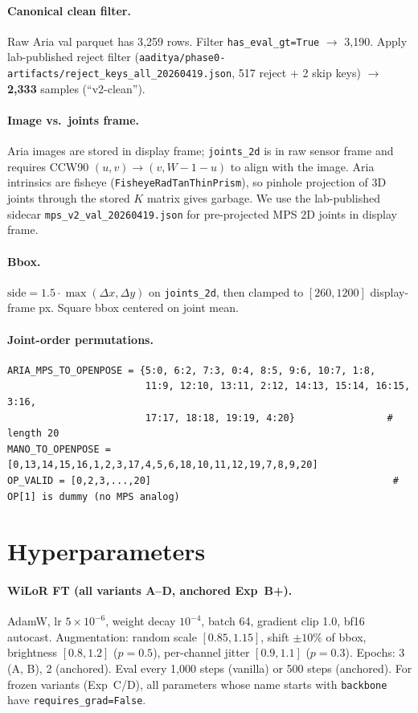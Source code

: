 \documentclass{article}
\begin{document}
\paragraph{Canonical clean filter.}
Raw Aria val parquet has 3{,}259 rows. Filter \texttt{has\_eval\_gt=True} $\to$ 3{,}190. Apply lab-published reject filter (\texttt{aaditya/phase0-artifacts/reject\_keys\_all\_20260419.json}, 517 reject + 2 skip keys) $\to$ \textbf{2{,}333} samples (``v2-clean'').

\paragraph{Image vs.\ joints frame.}
Aria images are stored in display frame; \texttt{joints\_2d} is in raw sensor frame and requires CCW90 $(u,v) \to (v, W{-}1{-}u)$ to align with the image. Aria intrinsics are fisheye (\texttt{FisheyeRadTanThinPrism}), so pinhole projection of 3D joints through the stored $K$ matrix gives garbage. We use the lab-published sidecar \texttt{mps\_v2\_val\_20260419.json} for pre-projected MPS 2D joints in display frame.

\paragraph{Bbox.}
$\text{side} = 1.5 \cdot \max(\Delta x, \Delta y)$ on \texttt{joints\_2d}, then clamped to $[260, 1200]$ display-frame px. Square bbox centered on joint mean.

\paragraph{Joint-order permutations.}
\begin{verbatim}
ARIA_MPS_TO_OPENPOSE = {5:0, 6:2, 7:3, 0:4, 8:5, 9:6, 10:7, 1:8,
                        11:9, 12:10, 13:11, 2:12, 14:13, 15:14, 16:15, 3:16,
                        17:17, 18:18, 19:19, 4:20}                # length 20
MANO_TO_OPENPOSE = [0,13,14,15,16,1,2,3,17,4,5,6,18,10,11,12,19,7,8,9,20]
OP_VALID = [0,2,3,...,20]                                          # OP[1] is dummy (no MPS analog)
\end{verbatim}

\section{Hyperparameters}
\label{app:hparams}

\paragraph{WiLoR FT (all variants A–D, anchored Exp~B+).}
AdamW, lr $5\!\times\!10^{-6}$, weight decay $10^{-4}$, batch 64, gradient clip 1.0, bf16 autocast. Augmentation: random scale $[0.85,1.15]$, shift $\pm10\%$ of bbox, brightness $[0.8,1.2]$ ($p{=}0.5$), per-channel jitter $[0.9,1.1]$ ($p{=}0.3$). Epochs: 3 (A, B), 2 (anchored). Eval every 1{,}000 steps (vanilla) or 500 steps (anchored). For frozen variants (Exp~C/D), all parameters whose name starts with \texttt{backbone} have \texttt{requires\_grad=False}.
\end{document}
